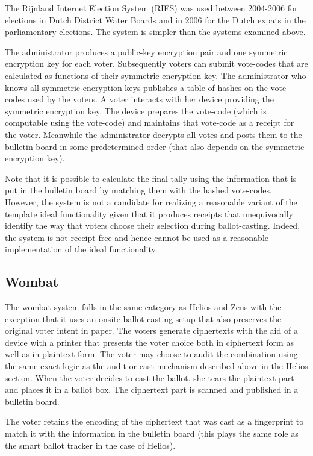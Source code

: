 The Rijnland Internet Election System (RIES) was used between
2004-2006 for elections in Dutch District Water Boards and in 2006 for
the Dutch expats in the parliamentary elections. The system is simpler
than the systems examined above.

The administrator produces a public-key encryption pair and one
symmetric encryption key for each voter. Subsequently voters can
submit vote-codes that are calculated as functions of their symmetric
encryption key. The administrator who knows all symmetric encryption
keys publishes a table of hashes on the vote-codes used by the
voters. A voter interacts with her device providing the symmetric
encryption key. The device prepares the vote-code (which is computable
using the vote-code) and maintains that vote-code as a receipt for the
voter. Meanwhile the administrator decrypts all votes and posts them
to the bulletin board in some predetermined order (that also depends
on the symmetric encryption key).

Note that it is possible to calculate the final tally using the
information that is put in the bulletin board by matching them with
the hashed vote-codes. However, the system is not a candidate for
realizing a reasonable variant of the template ideal functionality
given that it produces receipts that unequivocally identify the way
that voters choose their selection during ballot-casting. Indeed, the
system is not receipt-free and hence cannot be used as a reasonable
implementation of the ideal functionality.

\subsection{Wombat}

The wombat system \cite{wombat} falls in the same category as Helios
and Zeus with the exception that it uses an onsite ballot-casting
setup that also preserves the original voter intent in paper. The
voters generate ciphertexts with the aid of a device with a printer
that presents the voter choice both in ciphertext form as well as in
plaintext form. The voter may choose to audit the combination using
the same exact logic as the audit or cast mechanism described above in
the Helios section.  When the voter decides to cast the ballot, she
tears the plaintext part and places it in a ballot box. The ciphertext
part is scanned and published in a bulletin board.

The voter retains the encoding of the ciphertext that was cast as a
fingerprint to match it with the information in the bulletin board
(this plays the same role as the smart ballot tracker in the case of
Helios).

